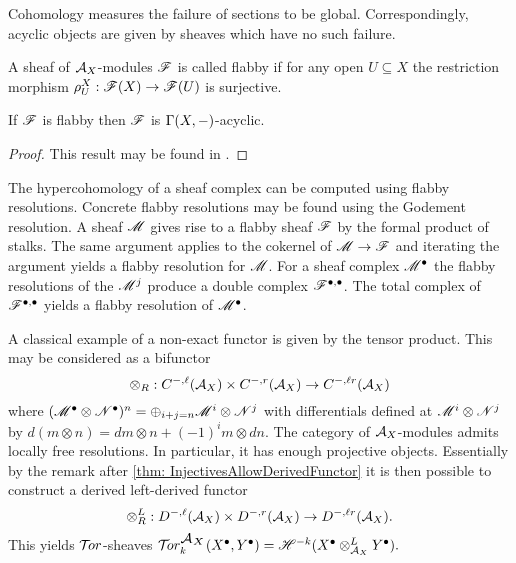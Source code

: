 Cohomology measures the failure of sections to be global.
Correspondingly, acyclic objects are given by sheaves which have no such failure.
\begin{definition}
 A sheaf of $\AA_X$-modules $\F$ is called flabby if for any open $U\subseteq X$ the restriction morphism $\rho_U^X:\F(X)\to\F(U) $ is surjective.
\end{definition}
\begin{proposition}
 If $\F$ is flabby then $\F$ is $\Gamma(X,\blank)$-acyclic.
\end{proposition}
\begin{proof}
  This result may be found in \cite[Chapter 2]{dimca2004sheaves}.
\end{proof}
The hypercohomology of a sheaf complex can be computed using flabby resolutions.
Concrete flabby resolutions may be found using the Godement resolution.
A sheaf $\M$ gives rise to a flabby sheaf $\F$ by the formal product of stalks.
The same argument applies to the cokernel of $\M\to \F$ and iterating the argument yields a flabby resolution for $\M$.
For a sheaf complex $\M^\bullet$ the flabby resolutions of the $\M^{j}$ produce a double complex $\F^{\bullet,\bullet}$.
The total complex of $\F^{\bullet, \bullet}$ yields a flabby resolution of $\M^\bullet$.


A classical example of a non-exact functor is given by the tensor product.
This may be considered as a bifunctor
$$ \otimes_R : C^{-,\ell}(\AA_X)\times C^{-,r}(\AA_X)\to C^{-,\ell r}(\AA_X)$$
where
$(\M^\bullet \otimes \N^\bullet)^n = \oplus_{i + j = n} \M^i \otimes \N^j $
with differentials defined at $\M^i \otimes \N^j$ by
$d(m\otimes n) = dm \otimes n + (-1)^i m \otimes dn.$
The category of $\AA_X$-modules admits locally free resolutions.
In particular, it has enough projective objects.
Essentially by the remark after \cref{thm: InjectivesAllowDerivedFunctor} it is then possible to construct a derived left-derived functor
$$ \otimes_R^L : D^{-,\ell}(\AA_X)\times D^{-,r}(\AA_X)\to D^{-,\ell r}(\AA_X).$$
This yields $\Tor$-sheaves
$\Tr{\AA_X}{k}(X^\bullet, Y^\bullet) = \H^{-k}(X^\bullet\otimes_{\AA_X}^L Y^\bullet).$


